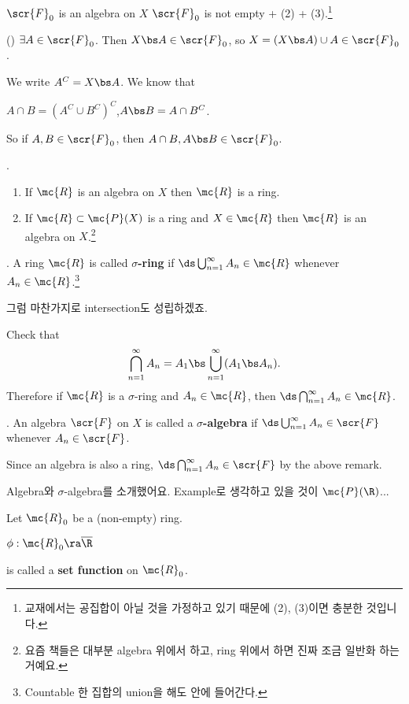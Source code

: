 \rmk \(\scr{F}_0\) is an algebra on \(X\) \miff \(\scr{F}_0\) is not empty + (2) + (3).\footnote{교재에서는 공집합이 아닐 것을 가정하고 있기 때문에 (2), (3)이면 충분한 것입니다.}

\pf (\mimpd) \(\exists A \in \scr{F}_0\). Then \(X \bs A \in \scr{F}_0\), so \(X = (X \bs A)\cup A \in \scr{F}_0\).

\medskip

\rmk We write \(A^C = X \bs A\). We know that
\begin{center}
    \(A \cap B = (A^C \cup B^C)^C\),\quad \(A\bs B = A \cap B^C\).
\end{center}
So if \(A, B \in \scr{F}_0\), then \(A \cap B, A \bs B \in \scr{F}_0\).

\medskip

\prop.
\begin{enumerate}
    \item If \(\mc{R}\) is an algebra on \(X\) then \(\mc{R}\) is a ring.
    \item If \(\mc{R} \subset \mc{P}(X)\) is a ring and \(X \in \mc{R}\) then \(\mc{R}\) is an algebra on \(X\).\footnote{요즘 책들은 대부분 algebra 위에서 하고, ring 위에서 하면 진짜 조금 일반화 하는 거예요.}
\end{enumerate}

\bigskip

.  A ring \(\mc{R}\) is called \textbf{\(\sigma\)-ring} if \(\ds \bigcup_{n=1}^\infty A_n \in \mc{R}\) whenever \(A_n \in \mc{R}\).\footnote{Countable 한 집합의 union을 해도 안에 들어간다.}

그럼 마찬가지로 intersection도 성립하겠죠.

\rmk Check that
\[
    \bigcap_{n=1}^\infty A_n = A_1 \bs \bigcup_{n=1}^\infty (A_1 \bs A_n).
\]
Therefore if \(\mc{R}\) is a \(\sigma\)-ring and \(A_n \in \mc{R}\), then \(\ds \bigcap_{n=1}^\infty A_n \in \mc{R}\).

\medskip

.  An algebra \(\scr{F}\) on \(X\) is called a \textbf{\(\sigma\)-algebra} if \(\ds \bigcup_{n=1}^\infty A_n \in \scr{F}\) whenever \(A_n \in \scr{F}\).

\rmk Since an algebra is also a ring, \(\ds \bigcap_{n=1}^\infty A_n \in \scr{F}\) by the above remark.

Algebra와 \(\sigma\)-algebra를 소개했어요. Example로 생각하고 있을 것이 \(\mc{P}(\R)\)...

\pagebreak

  Let \(\mc{R}_0\) be a (non-empty) ring.
\begin{center}
    \(\phi : \mc{R}_0 \ra \overline{\R}\)
\end{center}
is called a \textbf{set function} on \(\mc{R}_0\).

